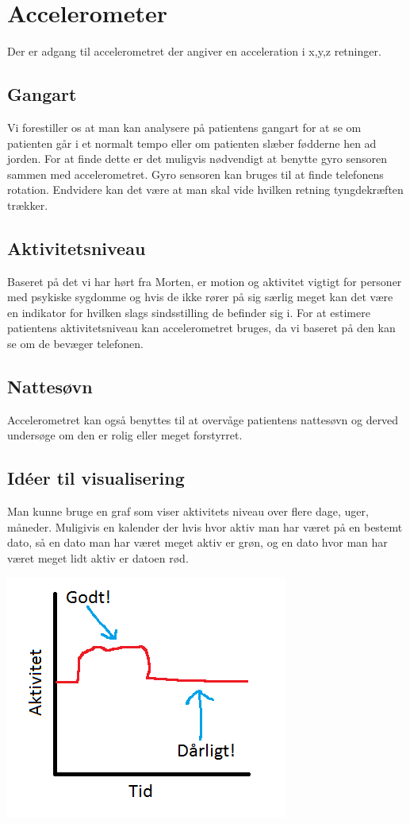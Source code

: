\section{Accelerometer}
Der er adgang til accelerometret der angiver en acceleration i x,y,z retninger.

\subsection{Gangart}
Vi forestiller os at man kan analysere på patientens gangart for at se om patienten går i et normalt tempo eller om patienten slæber fødderne hen ad jorden.
For at finde dette er det muligvis nødvendigt at benytte gyro sensoren sammen med accelerometret.
Gyro sensoren kan bruges til at finde telefonens rotation.
Endvidere kan det være at man skal vide hvilken retning tyngdekræften trækker.

\subsection{Aktivitetsniveau}
Baseret på det vi har hørt fra Morten, er motion og aktivitet vigtigt for personer med psykiske sygdomme og hvis de ikke rører på sig særlig meget kan det være en indikator for hvilken slags sindsstilling de befinder sig i.
For at estimere patientens aktivitetsniveau kan accelerometret bruges, da vi baseret på den kan se om de bevæger telefonen. 

\subsection{Nattesøvn}
Accelerometret kan også benyttes til at overvåge patientens nattesøvn og derved undersøge om den er rolig eller meget forstyrret.


\subsection{Idéer til visualisering} 
Man kunne bruge en graf som viser aktivitets niveau over flere dage, uger, måneder. Muligivis en kalender der hvis hvor aktiv man har været på en bestemt dato, så en dato man har været meget aktiv er grøn, og en dato hvor man har været meget lidt aktiv er datoen rød.

\includegraphics{graphics/aktivitet_billed}

